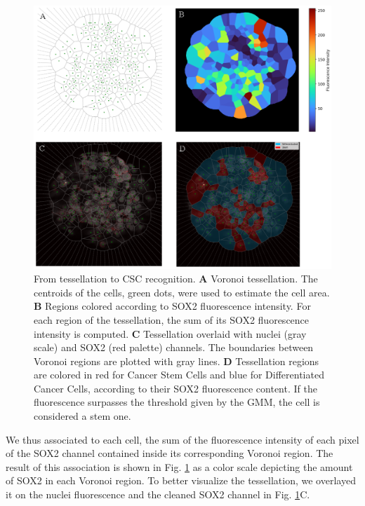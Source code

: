\documentclass[fleqn,10pt]{wlscirep}
\begin{document}
\begin{figure}[h!]
   \includegraphics[width=\textwidth]{images/tessellation_to_csc_recognition.eps}
   \caption{From tessellation to CSC recognition. \textbf{A} Voronoi tessellation. The centroids of the cells, green dots, were used to estimate the cell area. \textbf{B} Regions colored according to SOX2 fluorescence intensity. For each region of the tessellation, the sum of its SOX2 fluorescence intensity is computed. \textbf{C} Tessellation overlaid with nuclei (gray scale) and SOX2 (red palette) channels. The boundaries between Voronoi regions are plotted with gray lines. \textbf{D} Tessellation regions are colored in red for Cancer Stem Cells and blue for Differentiated Cancer Cells, according to their SOX2 fluorescence content. If the fluorescence surpasses the threshold given by the GMM, the cell is considered a stem one.}
   \label{fig: tessellation to clustered}
\end{figure}

We thus associated to each cell, the sum of the fluorescence intensity of each pixel of the SOX2 channel contained inside its corresponding Voronoi region. The result of this association is shown in Fig. \ref{fig: tessellation to clustered} as a color scale depicting the amount of SOX2 in each Voronoi region. To better visualize the tessellation, we overlayed it on the nuclei fluorescence and the cleaned SOX2 channel in Fig. \ref{fig: tessellation to clustered}C.
\end{document}
